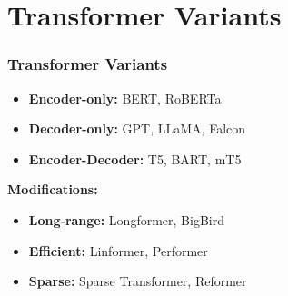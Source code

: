 \section{Transformer Variants}
\begin{frame}
    \frametitle{Transformer Variants}
    \begin{itemize}
        \item \textbf{Encoder-only:} BERT, RoBERTa
        \item \textbf{Decoder-only:} GPT, LLaMA, Falcon
        \item \textbf{Encoder-Decoder:} T5, BART, mT5
    \end{itemize}

    \textbf{Modifications:}
    \begin{itemize}
        \item \textbf{Long-range:} Longformer, BigBird
        \item \textbf{Efficient:} Linformer, Performer
        \item \textbf{Sparse:} Sparse Transformer, Reformer
    \end{itemize}
\end{frame}
